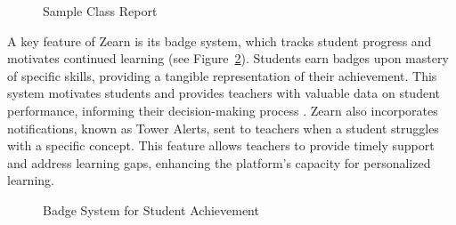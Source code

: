 \documentclass[
  number,
  preprint,
  3p,
  onecolumn]{elsarticle}
\begin{document}
\begin{figure}


\caption{\label{fig-class-report}Sample Class Report}

\end{figure}%

A key feature of Zearn is its badge system, which tracks student
progress and motivates continued learning (see
Figure~\ref{fig-badges-screen}). Students earn badges upon mastery of
specific skills, providing a tangible representation of their
achievement. This system motivates students and provides teachers with
valuable data on student performance, informing their decision-making
process \citep{knudsen2020}. Zearn also incorporates notifications,
known as Tower Alerts, sent to teachers when a student struggles with a
specific concept. This feature allows teachers to provide timely support
and address learning gaps, enhancing the platform's capacity for
personalized learning.

\begin{figure}


\caption{\label{fig-badges-screen}Badge System for Student Achievement}

\end{figure}%
\end{document}
